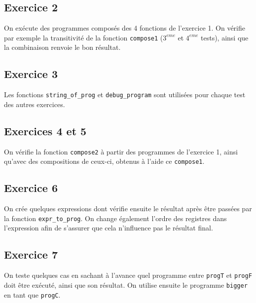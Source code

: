 \documentclass[11pt, a4paper, twoside, titlepage]{article}
\begin{document}
\subsection{Exercice 2}
On exécute des programmes composés des 4 fonctions de l'exercice 1. On vérifie par exemple la transitivité de la fonction \texttt{compose1} ($3^{eme}$ et $4^{eme}$ tests), ainsi que la combinaison renvoie le bon résultat.

\subsection{Exercice 3}
Les fonctions \texttt{string\_of\_prog} et \texttt{debug\_program} sont utilisées pour chaque test des autres exercices.

\subsection{Exercices 4 et 5}
On vérifie la fonction \texttt{compose2} à partir des programmes de l'exercice 1, ainsi qu'avec des compositions de ceux-ci, obtenus à l'aide ce \texttt{compose1}.

\subsection{Exercice 6}
On crée quelques expressions dont vérifie ensuite le résultat après être passées par la fonction \texttt{expr\_to\_prog}. On change également l'ordre des registres dans l'expression afin de s'assurer que cela n'influence pas le résultat final.

\subsection{Exercice 7}
On teste quelques cas en sachant à l'avance quel programme entre \texttt{progT} et \texttt{progF} doit être exécuté, ainsi que son résultat. On utilise ensuite le programme \texttt{bigger} en tant que \texttt{progC}.
\end{document}
